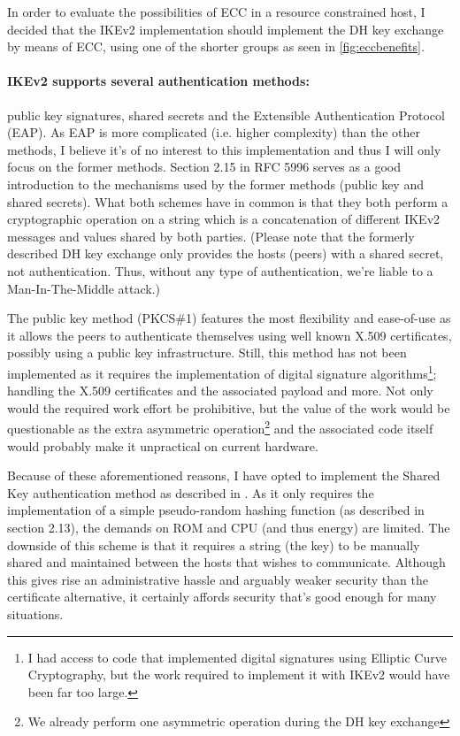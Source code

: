 \documentclass[final,a4paper,twoside,11pt,onecolumn]{report}
\begin{document}
In order to evaluate the possibilities of ECC in a resource constrained host, I decided that the IKEv2 implementation should implement the DH key exchange by means of ECC, using one of the shorter groups as seen in \vref{fig:eccbenefits}.


\paragraph{IKEv2 supports several authentication methods:} public key signatures, shared secrets and the Extensible Authentication Protocol (EAP)\cite{rfc3748}. As EAP is more complicated (i.e. higher complexity) than the other methods, I believe it's of no interest to this implementation and thus I will only focus on the former methods. Section 2.15 in RFC 5996 serves as a good introduction to the mechanisms used by the former methods (public key and shared secrets). What both schemes have in common is that they both perform a cryptographic operation on a string which is a concatenation of different IKEv2 messages and values shared by both parties\citep[p.48]{rfc5996}. (Please note that the formerly described DH key exchange only provides the hosts (peers) with a shared secret, not authentication. Thus, without any type of authentication, we're liable to a Man-In-The-Middle attack.)

The public key method (PKCS\#1) features the most flexibility and ease-of-use as it allows the peers to authenticate themselves using well known X.509 certificates, possibly using a public key infrastructure. Still, this method has not been implemented as it requires the implementation of digital signature algorithms\footnote{I had access to code that implemented digital signatures using Elliptic Curve Cryptography, but the work required to implement it with IKEv2 would have been far too large.}; handling the X.509 certificates and the associated payload and more. Not only would the required work effort be prohibitive, but the value of the work would be questionable as the extra asymmetric operation\footnote{We already perform one asymmetric operation during the DH key exchange} and the associated code itself would probably make it unpractical on current hardware.

Because of these aforementioned reasons, I have opted to implement the Shared Key authentication method as described in \citep[p.49]{rfc5996}. As it only requires the implementation of a simple pseudo-random hashing function (as described in section 2.13), the demands on ROM and CPU (and thus energy) are limited. The downside of this scheme is that it requires a string (the key) to be manually shared and maintained between the hosts that wishes to communicate. Although this gives rise an administrative hassle and arguably weaker security than the certificate alternative, it certainly affords security that's good enough for many situations.
\end{document}
